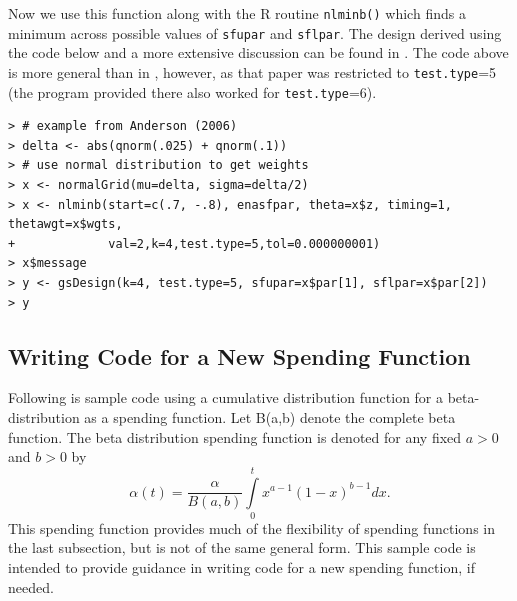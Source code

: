 Now we use this function along with the R routine \texttt{nlminb()} which
finds a minimum across possible values of \texttt{sfupar} and \texttt{sflpar}.
The design derived using the code below and a more extensive discussion can be
found in \cite{AndBMJ}. The code above is more general than in \cite{AndBMJ},
however, as that paper was restricted to \texttt{test.type}=5 (the program
provided there also worked for \texttt{test.type}=6).

\bigskip

\begin{verbatim}
> # example from Anderson (2006)
> delta <- abs(qnorm(.025) + qnorm(.1))
> # use normal distribution to get weights
> x <- normalGrid(mu=delta, sigma=delta/2)
> x <- nlminb(start=c(.7, -.8), enasfpar, theta=x$z, timing=1, thetawgt=x$wgts,
+             val=2,k=4,test.type=5,tol=0.000000001)
> x$message
> y <- gsDesign(k=4, test.type=5, sfupar=x$par[1], sflpar=x$par[2])
> y
\end{verbatim}

\subsection{Writing Code for a New Spending Function\label{sec:newspendfn}}

Following is sample code using a cumulative distribution function for a
beta-distribution as a spending function. Let B(a,b) denote the complete beta
function. The beta distribution spending function is denoted for any
fixed $a>0$ and $b>0$ by%
\[
\alpha(t)=\frac{\alpha}{B(a,b)}%
{\textstyle\int\limits_{0}^{t}}
x^{a-1}(1-x)^{b-1}dx.
\]
This spending function provides much of the flexibility of spending functions
in the last subsection, but is not of the same general form. This sample code
is intended to provide guidance in writing code for a new spending function,
if needed.

